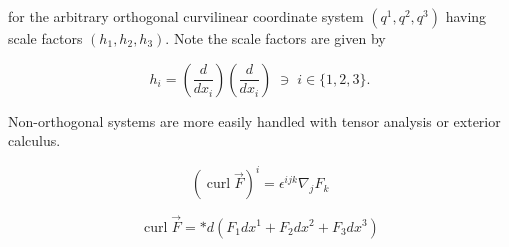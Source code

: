 \documentclass[12pt]{article}
\begin{document}
for the arbitrary orthogonal curvilinear coordinate system
$(q^{1},q^{2},q^{3})$ having scale factors $(h_{1},h_{2},h_{3})$.
Note the scale factors are given by

\[
h_{i}=\left(\frac{d}{dx_{i}}\right)\left(\frac{d}{dx_{i}}\right)\;\ni\;
i\in \{1,2,3\}.
\]

 Non-orthogonal systems are more easily handled with
tensor analysis or exterior calculus. 

\[ (\operatorname{curl}\vec{F})^i = \epsilon^{ijk} \nabla_j F_k \]

\[ \operatorname{curl}\vec{F} = * d (F_1 dx^1 + F_2 dx^2 + F_3 dx^3) \]
\end{document}

